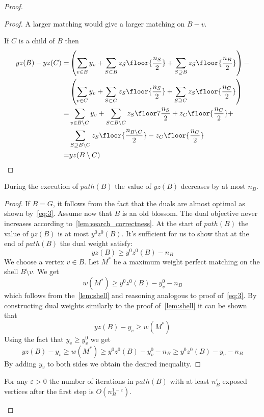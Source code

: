 \begin{proof}
\begin{proof}
    A larger matching would give a larger matching on $B - v$.

    If $C$ is a child of $B$ then
    \begin{align*}
    yz(B) - yz(C) =& 
      \left(\sum_{v \in B} y_v + \sum_{S \subset B} z_S \floor{\frac{n_S}{2}} + \sum_{S \supseteq B} z_S \floor{\frac{n_B}{2}}\right) - \\
    & \left(\sum_{v \in C} y_v + \sum_{S \subset C} z_S \floor{\frac{n_S}{2}} + \sum_{S \supseteq C} z_S \floor{\frac{n_C}{2}}\right)  \\
    =& \sum_{v \in B \setminus C} y_v + \sum_{S \subset B \setminus C} z_S \floor7 {\frac{n_S}{2}} + z_C\floor{\frac{n_C}{2}} + \\
    & \sum_{S \supseteq B \setminus C} z_S \floor{\frac{n_{B \setminus C}}{2}} - z_C\floor{\frac{n_C}{2}} \\
    =& yz(B \setminus C)
    \end{align*}
\end{proof}

\begin{lemma}\label{lem:pathyz}
    During the execution of $path(B)$ the value of $yz(B)$ decreases by at most $n_B$.
\end{lemma}

\begin{proof}
    If $B = G$, it follows from the fact that the duals are almost optimal as shown by~\ref{eq:3}.
    Assume now that $B$ is an old blossom. The dual objective never increases according to~\ref{lem:search_correctness}. At the start of $path(B)$ the value of $yz(B)$ is at most $y^0z^0(B)$. It's sufficient for us to show that at the end of $path(B)$ the dual weight satisfy:
    \[ yz(B) \geq y^0z^0(B) - n_B \]
    We choose a vertex $v \in B$. Let $M^*$ be a maximum weight perfect matching on the shell $B \setminus v$. We get
    \[ w(M^*) \geq y^0z^0(B) - y^0_v - n_B \]
    which follows from the~\ref{lem:shell} and reasoning analogous to proof of~\ref{eq:3}. By constructing dual weights similarly to the proof of~\ref{lem:shell} it can be shown that
    \[ yz(B) - y_v \geq w(M^*) \]
    Using the fact that $y_v \geq y_v^0$ we get
    \[ yz(B) - y_v \geq w(M^*) \geq y^0z^0(B) - y^0_v - n_B \geq y^0z^0(B) - y_v - n_B \]
    By adding $y_v$ to both sides we obtain the desired inequality.
\end{proof}

\begin{lemma}\label{lem:epsilon}
    For any $\varepsilon > 0$ the number of iterations in $path(B)$ with at least $n_B^\varepsilon$ exposed vertices after the first step is $O(n_B^{1-\varepsilon})$.
\end{lemma}


\end{proof}
